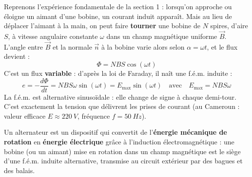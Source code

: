 \documentclass[11pt]{article}
\newcommand{\cle}[1]{{\popxbold\color{popdark}#1}}
\begin{document}
Reprenons l'expérience fondamentale de la section 1 : lorsqu'on approche ou éloigne un aimant d'une bobine, un courant induit apparaît. Mais au lieu de déplacer l'aimant à la main, on peut faire \textbf{tourner} une bobine de $N$ spires, d'aire $S$, à vitesse angulaire constante $\omega$ dans un champ magnétique uniforme $\vec{B}$. L'angle entre $\vec{B}$ et la normale $\vec{n}$ à la bobine varie alors selon $\alpha = \omega t$, et le flux devient :
\[ \Phi = NBS\cos(\omega t) \]
C'est un flux \textbf{variable} : d'après la loi de Faraday, il naît une f.é.m. induite :
\[ e = -\dfrac{d\Phi}{dt} = NBS\omega\sin(\omega t) = E_{\max}\sin(\omega t) \quad \text{avec} \quad E_{\max} = NBS\omega \]
La f.é.m. est \cle{alternative sinusoïdale} : elle change de signe à chaque demi-tour. C'est exactement la tension que délivrent les prises de courant (au Cameroun : valeur efficace $E \approx \SI{220}{V}$, fréquence $f = \SI{50}{Hz}$).

\begin{definition}[Alternateur]
Un \cle{alternateur} est un dispositif qui convertit de l'\textbf{énergie mécanique de rotation} en \textbf{énergie électrique} grâce à l'induction électromagnétique : une bobine (ou un aimant) mise en rotation dans un champ magnétique est le siège d'une f.é.m. induite alternative, transmise au circuit extérieur par des bagues et des balais.
\end{definition}
\end{document}
